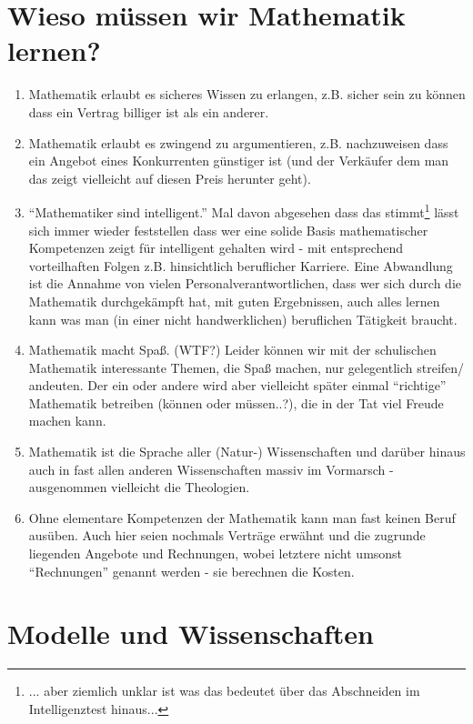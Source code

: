 \documentclass[a4paper]{book}%
\theoremstyle{definition}
\begin{document}
\section{Wieso müssen wir Mathematik lernen?}\label{MathematikWieso}

\begin{enumerate}
  \item Mathematik erlaubt es sicheres Wissen zu erlangen, z.B. sicher sein zu können dass ein Vertrag billiger ist als ein anderer.
  \item Mathematik erlaubt es zwingend zu argumentieren, z.B. nachzuweisen dass ein Angebot eines Konkurrenten günstiger ist (und der Verkäufer dem man das zeigt vielleicht auf diesen Preis herunter geht).
  \item \enquote{Mathematiker sind intelligent.} Mal davon abgesehen dass das stimmt\footnote{... aber ziemlich unklar ist was das bedeutet über das Abschneiden im Intelligenztest hinaus...} lässt sich immer wieder feststellen dass wer eine solide Basis mathematischer Kompetenzen zeigt für intelligent gehalten wird - mit entsprechend vorteilhaften Folgen z.B. hinsichtlich beruflicher Karriere. Eine Abwandlung ist die Annahme von vielen Personalverantwortlichen, dass wer sich durch die Mathematik durchgekämpft hat, mit guten Ergebnissen, auch alles lernen kann was man (in einer nicht handwerklichen) beruflichen Tätigkeit braucht.
  \item Mathematik macht Spaß. (WTF?) Leider können wir mit der schulischen Mathematik interessante Themen, die Spaß machen, nur gelegentlich streifen/ andeuten. Der ein oder andere wird aber vielleicht später einmal \enquote{richtige} Mathematik betreiben (können oder müssen..?), die in der Tat viel Freude machen kann.
  \item Mathematik ist die Sprache aller (Natur-) Wissenschaften und darüber hinaus auch in fast allen anderen Wissenschaften massiv im Vormarsch - ausgenommen vielleicht die Theologien.
  \item Ohne elementare Kompetenzen der Mathematik kann man fast keinen Beruf ausüben. Auch hier seien nochmals Verträge erwähnt und die zugrunde liegenden Angebote und Rechnungen, wobei letztere nicht umsonst \enquote{Rechnungen} genannt werden - sie berechnen die Kosten.
\end{enumerate}


\section{Modelle und Wissenschaften}\label{ModelleUndWissenschaften}
\end{document}
